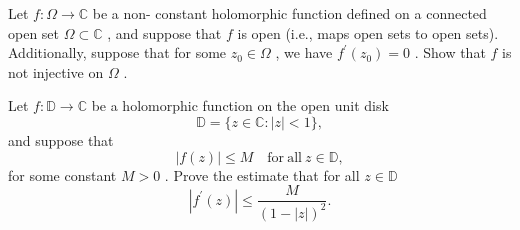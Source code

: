 \documentclass[openany]{book}
\begin{document}
\begin{prob}
Let \(f:\Omega \to \mathbb{C}\) be a non- constant holomorphic function defined on a connected open set \(\Omega \subset \mathbb{C}\) , and suppose that \(f\) is open (i.e., maps open sets to open sets). Additionally, suppose that for some \(z_{0}\in \Omega\) , we have \(f^{\prime}(z_{0}) = 0\) . Show that \(f\) is not injective on \(\Omega\) .
\end{prob}


\begin{prob}
Let \(f:\mathbb{D}\to \mathbb{C}\) be a holomorphic function on the open unit disk
\[\mathbb{D} = \{z\in \mathbb{C}:|z|< 1\} ,\]
and suppose that
\[|f(z)|\leq M\quad \mathrm{for~all~}z\in \mathbb{D},\]
for some constant \(M > 0\) . Prove the estimate that for all \(z\in \mathbb{D}\)
\[|f^{\prime}(z)|\leq \frac{M}{(1 - |z|)^{2}}.\]
\end{prob}


\end{document}
